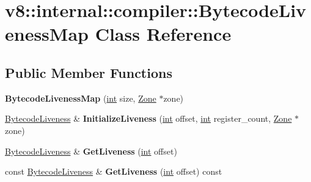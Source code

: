 \hypertarget{classv8_1_1internal_1_1compiler_1_1BytecodeLivenessMap}{}\section{v8\+:\+:internal\+:\+:compiler\+:\+:Bytecode\+Liveness\+Map Class Reference}
\label{classv8_1_1internal_1_1compiler_1_1BytecodeLivenessMap}
\subsection*{Public Member Functions}
\begin{DoxyCompactItemize}
\item 
\mbox{\label{classv8_1_1internal_1_1compiler_1_1BytecodeLivenessMap_a9d3ce7d0b33fbe6fe5f89df98291b790}} 
{\bfseries Bytecode\+Liveness\+Map} (\mbox{\hyperlink{classint}{int}} size, \mbox{\hyperlink{classv8_1_1internal_1_1Zone}{Zone}} $\ast$zone)
\item 
\mbox{\label{classv8_1_1internal_1_1compiler_1_1BytecodeLivenessMap_af5e1ae5298a63470e5774bfe536a8567}} 
\mbox{\hyperlink{structv8_1_1internal_1_1compiler_1_1BytecodeLiveness}{Bytecode\+Liveness}} \& {\bfseries Initialize\+Liveness} (\mbox{\hyperlink{classint}{int}} offset, \mbox{\hyperlink{classint}{int}} register\+\_\+count, \mbox{\hyperlink{classv8_1_1internal_1_1Zone}{Zone}} $\ast$zone)
\item 
\mbox{\label{classv8_1_1internal_1_1compiler_1_1BytecodeLivenessMap_ac42e89e784d421ba3487aa68270c6677}} 
\mbox{\hyperlink{structv8_1_1internal_1_1compiler_1_1BytecodeLiveness}{Bytecode\+Liveness}} \& {\bfseries Get\+Liveness} (\mbox{\hyperlink{classint}{int}} offset)
\item 
\mbox{\label{classv8_1_1internal_1_1compiler_1_1BytecodeLivenessMap_a7c19e66ef4070e5d70892c2009716be9}} 
const \mbox{\hyperlink{structv8_1_1internal_1_1compiler_1_1BytecodeLiveness}{Bytecode\+Liveness}} \& {\bfseries Get\+Liveness} (\mbox{\hyperlink{classint}{int}} offset) const
\item 
\mbox{\label{classv8_1_1internal_1_1compiler_1_1BytecodeLivenessMap_a4978c28c8a8bdaa587530e7deaede38d}} 

\end{DoxyCompactItemize}
